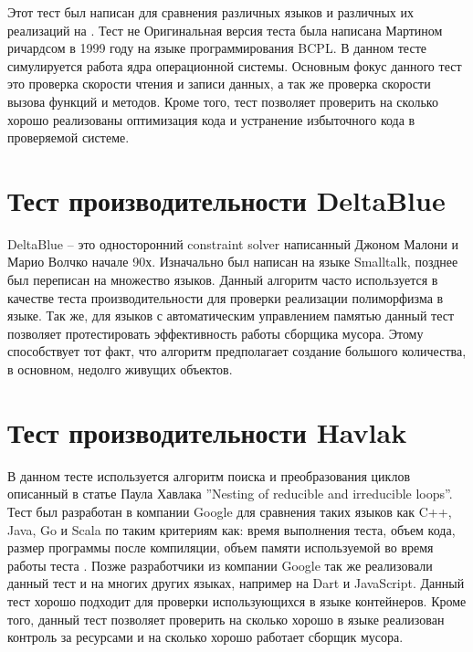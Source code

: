 Этот тест был написан для сравнения различных языков и различных их реализаций на . Тест не
Оригинальная версия теста была написана Мартином ричардсом в 1999 году на языке программирования BCPL. В данном тесте симулируется работа ядра операционной системы.
Основным фокус данного тест это проверка скорости чтения и записи данных, а так же проверка скорости вызова функций и методов. Кроме того, тест позволяет проверить на сколько хорошо реализованы оптимизация кода и устранение избыточного кода в проверяемой системе.
\cite{Richards}

\section{Тест производительности DeltaBlue}

DeltaBlue -- это односторонний constraint solver написанный Джоном Малони и Марио Волчко начале 90х. Изначально был написан на языке Smalltalk, позднее был переписан на множество языков. Данный алгоритм часто используется в качестве теста производительности для проверки реализации полиморфизма в языке. Так же, для языков с автоматическим управлением памятью данный тест позволяет протестировать эффективность работы сборщика мусора. Этому способствует тот факт, что алгоритм предполагает создание большого количества, в основном, недолго живущих объектов.
\cite{DeltaBlueST, DeltaBlue, DeltaBlue2}

\section{Тест производительности Havlak}

В данном тесте используется алгоритм поиска и преобразования циклов описанный в статье Паула Хавлака ”Nesting of reducible and irreducible
loops”. \cite{Havlak} Тест был разработан в компании Google для сравнения таких языков как C++, Java, Go и Scala по таким критериям как: время выполнения теста, объем кода, размер программы после компиляции, объем памяти используемой во время работы теста \cite{HavlakBench}. Позже разработчики из компании Google так же реализовали данный тест и на многих других языках, например на Dart и JavaScript. Данный тест хорошо подходит для проверки использующихся в языке контейнеров. Кроме того, данный тест позволяет проверить на сколько хорошо в языке реализован контроль за ресурсами и на сколько хорошо работает сборщик мусора.

